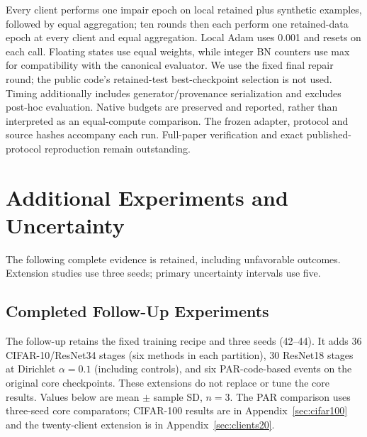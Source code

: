 \documentclass[software,article,submit,moreauthors]{Definitions/mdpi}
\begin{document}
Every client performs one impair epoch on local retained plus synthetic
examples, followed by equal aggregation; ten rounds then each perform one
retained-data epoch at every client and equal aggregation. Local Adam uses
0.001 and resets on each call. Floating states use equal weights, while integer
BN counters use max for compatibility with the canonical evaluator. We use the
fixed final repair round; the public code's retained-test best-checkpoint
selection is not used. Timing additionally includes generator/provenance
serialization and excludes post-hoc evaluation. Native budgets are preserved
and reported, rather than interpreted as an equal-compute comparison.
The frozen adapter, protocol and source hashes accompany each run. Full-paper
verification and exact published-protocol reproduction remain outstanding.


\section{Additional Experiments and Uncertainty}
\label{sec:extensions}
The following complete evidence is retained, including unfavorable outcomes.
Extension studies use three seeds; primary uncertainty intervals use five.
\subsection{Completed Follow-Up Experiments}

\label{sec:followup}

The follow-up retains the fixed training recipe and three seeds (42--44). It adds 36 CIFAR-10/ResNet34 stages (six methods in each partition), 30 ResNet18 stages at Dirichlet $\alpha=0.1$ (including controls), and six PAR-code-based events on the original core checkpoints. These extensions do not replace or tune the core results.  Values below are mean $\pm$ sample SD, $n=3$. The PAR comparison uses three-seed core comparators; CIFAR-100 results are in Appendix~\ref{sec:cifar100} and the twenty-client extension is in Appendix~\ref{sec:clients20}.
\end{document}

